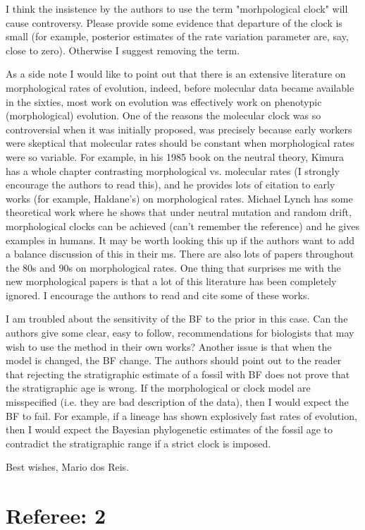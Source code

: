 \documentclass[11pt]{article}
\begin{document}
I think the insistence by the authors to use the term "morhpological clock" will cause controversy. Please provide some evidence that departure of the clock is small (for example, posterior estimates of the rate variation parameter are, say, close to zero). Otherwise I suggest removing the term.

As a side note I would like to point out that there is an extensive literature on morphological rates of evolution, indeed, before molecular data became available in the sixties, most work on evolution was effectively work on phenotypic (morphological) evolution. One of the reasons the molecular clock was so controversial when it was initially proposed, was precisely because early workers were skeptical that molecular rates should be constant when morphological rates were so variable. For example, in his 1985 book on the neutral theory, Kimura has a whole chapter contrasting morphological vs. molecular rates (I strongly encourage the authors to read this), and he provides lots of citation to early works (for example, Haldane's) on morphological rates. Michael Lynch has some theoretical work where he shows that under neutral mutation and random drift, morphological clocks can be achieved (can't remember the reference) and he gives examples in humans. It may be worth looking this up if the authors want to add a balance discussion of this in their ms. There are also lots of papers throughout the 80s and 90s on morphological rates. One thing that surprises me with the new morphological papers is that a lot of this literature has been completely ignored. I encourage the authors to read and cite some of these works.

I am troubled about the sensitivity of the BF to the prior in this case. Can the authors give some clear, easy to follow, recommendations for biologists that may wish to use the method in their own works? Another issue is that when the model is changed, the BF change. The authors should point out to the reader that rejecting the stratigraphic estimate of a fossil with BF does not prove that the stratigraphic age is wrong. If the morphological or clock model are misspecified (i.e. they are  bad description of the data), then I would expect the BF to fail. For example, if a lineage has shown explosively fast rates of evolution, then I would expect the Bayesian phylogenetic estimates of the fossil age to contradict the stratigraphic range if a strict clock is imposed.

Best wishes,
Mario dos Reis.

\section*{Referee: 2}
\end{document}
